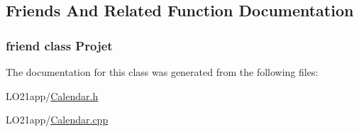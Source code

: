 \subsection{Friends And Related Function Documentation}
\hypertarget{class_projet_1_1_iterator_ab87b41c3faa36955cc370972f5cce344}{}
\subsubsection[{Projet}]{\setlength{\rightskip}{0pt plus 5cm}friend class {\bf Projet}\hspace{0.3cm}{\ttfamily [friend]}}\label{class_projet_1_1_iterator_ab87b41c3faa36955cc370972f5cce344}


The documentation for this class was generated from the following files\+:\begin{DoxyCompactItemize}
\item 
L\+O21app/\hyperlink{_calendar_8h}{Calendar.\+h}\item 
L\+O21app/\hyperlink{_calendar_8cpp}{Calendar.\+cpp}\end{DoxyCompactItemize}
